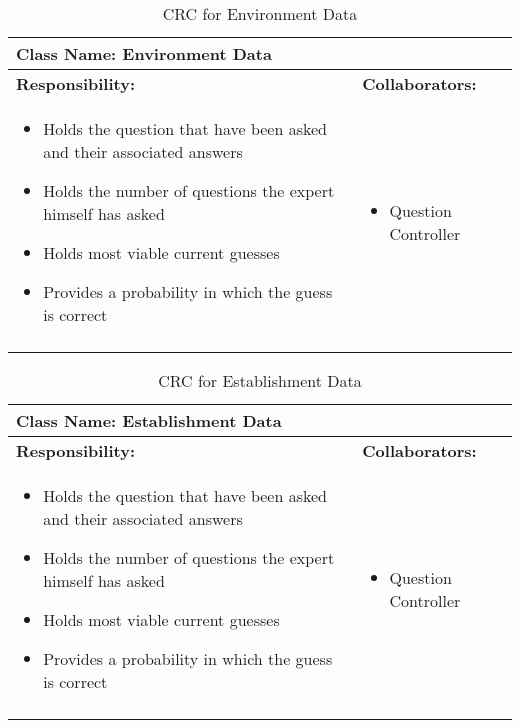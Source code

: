\documentclass[titlepage]{article}
\begin{document}
	\begin{longtable}{| p{} | p{} |}
			\hline
			 \multicolumn{2}{|l|}{\textbf{Class Name: Environment Data}} \\
			\hline
			\textbf{Responsibility:} & \textbf{Collaborators:} \\
			\hline
				\begin{itemize}
					\item Holds the question that have been asked and their associated answers
					\item Holds the number of questions the expert himself has asked
					\item Holds most viable current guesses
					\item Provides a probability in which the guess is correct
				\end{itemize} & 
				\begin{itemize}
					\item Question Controller
				\end{itemize} 
				\\
			\hline
		\caption{CRC for Environment Data}
	\end{longtable}
	
\newpage
	\begin{longtable}{| p{} | p{} |}
			\hline
			 \multicolumn{2}{|l|}{\textbf{Class Name: Establishment Data}} \\
			\hline
			\textbf{Responsibility:} & \textbf{Collaborators:} \\
			\hline
				\begin{itemize}
					\item Holds the question that have been asked and their associated answers
					\item Holds the number of questions the expert himself has asked
					\item Holds most viable current guesses
					\item Provides a probability in which the guess is correct
				\end{itemize} & 
				\begin{itemize}
					\item Question Controller
				\end{itemize} 
				\\
			\hline
		\caption{CRC for Establishment Data}
	\end{longtable}
	
\end{document}

